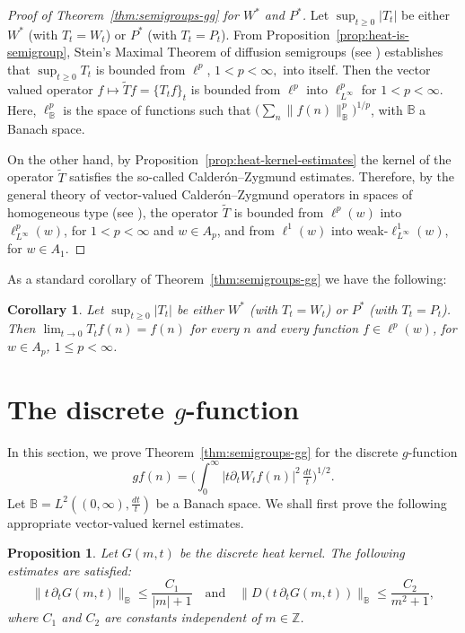 \documentclass[11pt]{amsart}
\numberwithin{equation}{section}
\newcommand{\Z}{\mathbb{Z}}
\theoremstyle{plain}
\newtheorem{prop}{Proposition}
\newtheorem{coro}{Corollary}
\theoremstyle{remark}
\begin{document}
\begin{proof}[Proof of Theorem~\ref{thm:semigroups-gg} for $W^*$ and $P^*$]
Let $\sup_{t\ge0} |T_t|$ be either $W^*$ (with $T_t=W_t$) or $P^*$ (with $T_t=P_t$). From Proposition~\ref{prop:heat-is-semigroup}, Stein's Maximal Theorem of diffusion semigroups (see \cite[Chapter~III, Section~2]{St-rojo}) establishes that $\sup_{t\ge0} T_t$ is bounded from $\ell^p$, $1< p< \infty,$ into itself. Then the vector valued operator  $f \mapsto \widetilde{T}f= \{T_t f\}_t$ is bounded from $\ell^p$ into $\ell^p_{L^\infty}$ for $1<p<\infty$. Here, $\ell^p_{\mathbb{B}}$ is the space of functions such that $\big(\sum_n\|f(n)\|^p_{\mathbb{B}}\big)^{1/p}$, with $\mathbb{B}$ a Banach space.

On the other hand, by Proposition~\ref{prop:heat-kernel-estimates} the kernel of the operator $\widetilde{T}$ satisfies the so-called Calder\'on--Zygmund estimates. Therefore, by the general theory of vector-valued Calder\'on--Zygmund operators in spaces of homogeneous type (see \cite{Rubio-Ruiz-Torrea,Ruiz-Torrea}), the operator $\widetilde{T}$
is bounded from $\ell^p(w)$ into $\ell^p_{L^\infty}(w)$, for $1<p<\infty$ and $w\in A_p$, and
from $\ell^1(w) $ into weak-$\ell^1_{L^\infty}(w)$, for $w\in A_1$.
\end{proof}

As a standard corollary of Theorem~\ref{thm:semigroups-gg} we have the following:

\begin{coro}
Let $\sup_{t\ge0} |T_t|$ be either $W^*$ (with $T_t=W_t$) or $P^*$ (with $T_t=P_t$). Then
$\lim_{t\to 0} T_t f(n) = f(n)$ for every $n$ and every function $f\in \ell^p(w)$, for $w\in A_p$, $1\le p < \infty$.
\end{coro}

\section{The discrete $g$-function}
\label{sec:gg}

In this section, we prove Theorem~\ref{thm:semigroups-gg} for the discrete $g$-function
\[
gf(n) = \Big(\int_0^{\infty} |t\partial_t W_tf(n)|^2 \,\tfrac{dt}{t}\Big)^{1/2}.
\]
Let $\mathbb{B}=L^2((0,\infty),\frac{dt}{t})$ be a Banach space.
We shall first prove the following appropriate vector-valued kernel estimates.

\begin{prop}
\label{prop:gg-kernel-estimates}
Let $G(m,t)$ be the discrete heat kernel.
The following estimates are satisfied:
\begin{equation*}
\|t\,\partial_t G(m,t)\|_{\mathbb{B}}\le \frac{C_1}{|m|+1} \quad\text{and}\quad
\|D(t\,\partial_t G(m,t))\|_{\mathbb{B}}\le \frac{C_2}{m^2+1},
\end{equation*}
where $C_1$ and $C_2$ are constants independent of $m\in \Z$.
\end{prop}
\end{document}
